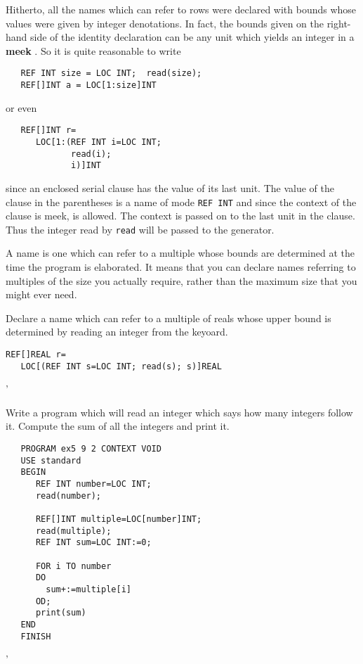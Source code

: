 Hitherto, all the names which can refer to rows
were declared with bounds whose values were given by integer
denotations.  In fact, the bounds given on the right-hand side of the
identity declaration can be any unit which yields an integer in a
\textbf{meek} .  So it is quite reasonable
to write
\begin{verbatim}
   REF INT size = LOC INT;  read(size);
   REF[]INT a = LOC[1:size]INT
\end{verbatim}
\noindent
or even
\begin{verbatim}
   REF[]INT r=
      LOC[1:(REF INT i=LOC INT;
             read(i);
             i)]INT
\end{verbatim}
\noindent
since an enclosed serial clause has the value of its last unit.  The
value of the clause in the parentheses is a name of mode
\verb|REF INT| and since the context of the clause is meek,
 is allowed. The context is
passed on to the last unit in the clause.  Thus the integer read by
\verb|read| will be passed to the generator.

A  name is one which can refer to
a multiple whose bounds are determined at the time the program is
elaborated. It means that you can declare names referring to
multiples of the size you actually require, rather than the maximum
size that you might ever need.
\newpage

\begin{exercise}
\item Declare a name which can refer to a multiple of reals whose
upper bound is determined by reading an integer from the keyoard.
\ans \ %
\begin{verbatim}
REF[]REAL r=
   LOC[(REF INT s=LOC INT; read(s); s)]REAL
\end{verbatim}
'
\item Write a program which will read an integer which says how many
integers follow it. Compute the sum of all the integers and print it.
\ans \ %
\begin{verbatim}
   PROGRAM ex5 9 2 CONTEXT VOID
   USE standard
   BEGIN
      REF INT number=LOC INT;
      read(number);

      REF[]INT multiple=LOC[number]INT;
      read(multiple);
      REF INT sum=LOC INT:=0;

      FOR i TO number
      DO
        sum+:=multiple[i]
      OD;
      print(sum)
   END
   FINISH
\end{verbatim}
'
\end{exercise}


